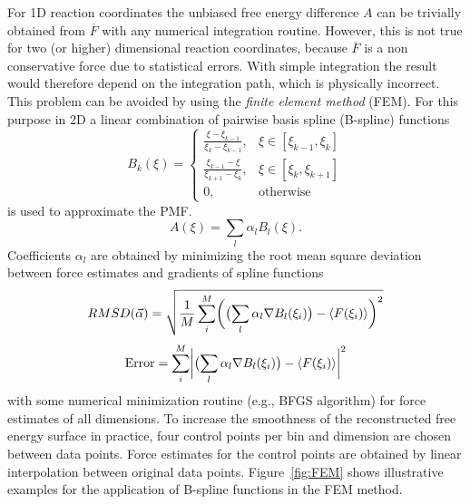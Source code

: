 For 1D reaction coordinates the unbiased free energy difference $A$ can be trivially obtained from $\overline{F}$ with any numerical integration routine.\autocite{davis2007methods}
However, this is not true for two (or higher) dimensional reaction coordinates, because $\overline{F}$ is a non conservative force due to statistical errors.\autocite{comer2015adaptive} With simple integration the result would therefore depend on the integration path, which is physically incorrect. This problem can be avoided by using the \textit{finite element method} (FEM).\autocite{darve2008adaptive} For this purpose in 2D a linear combination of pairwise basis spline (B-spline)\autocite{de1972calculating} functions
\begin{equation}
  B_k(\xi)=\left\{\begin{array}{ll} \frac{\xi-\xi_{k-1}}{\xi_k-\xi_{k-1}}, & \xi \in [\xi_{k-1},\xi_k] \\
                                    \frac{\xi_{k-1}-\xi}{\xi_{k+1}-\xi_{k}}, & \xi \in [\xi_{k},\xi_{k+1}] \\
                                    0, & \text{otherwise}
                  \end{array}\right.
  \label{eq:B spline}
\end{equation}
is used to approximate the PMF.
\begin{equation}
  A(\xi) = \sum_l \alpha_l B_l(\xi). \label{eq:FEM}
\end{equation}
Coefficients $\alpha_l$ are obtained by minimizing the root mean square deviation between force estimates and gradients of spline functions
\begin{equation}
  RMSD(\vec{\alpha})=\sqrt{\frac{1}{M}\sum_i^M\biggl(\bigl(\sum_l \alpha_l \nabla B_l(\xi_i)\bigr) - \braket{F(\xi_i)} \biggr)^2}
  \label{eq:RMSD}
\end{equation}
\begin{equation}
\text{Error}=\sum_i^M\biggl|\bigl(\sum_l \alpha_l \nabla B_l(\xi_i)\bigr) - \braket{F(\xi_i)} \biggr|^2
  \label{eq:power}
\end{equation}
with some numerical minimization routine (e.g., BFGS algorithm\autocite{nocedal2006numerical}) for force estimates of all dimensions.\autocite{darve2008adaptive} To increase the smoothness of the reconstructed free energy surface in practice, four control points per bin and dimension are chosen between data points. Force estimates for the control points are obtained by linear interpolation between original data points. Figure~\ref{fig:FEM} shows illustrative examples for the application of B-spline functions in the FEM method.
